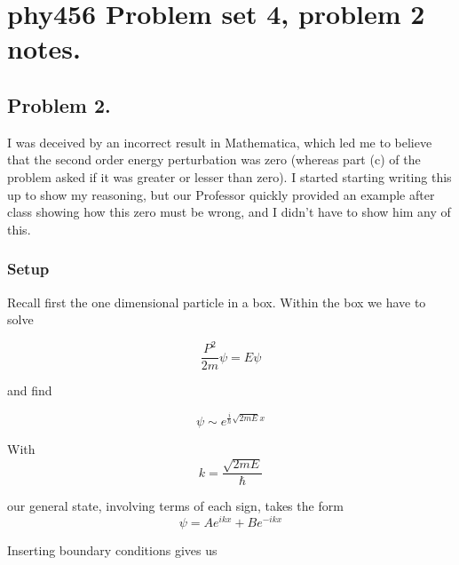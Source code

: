 
%

\chapter{phy456 Problem set 4, problem 2 notes.}
\label{chap:qmTwoPs4}
{}
\date{Oct 12, 2011}

\beginArtNoToc

\section{Problem 2.}

I was deceived by an incorrect result in Mathematica, which led me to believe that the second order energy perturbation was zero (whereas part (c) of the problem asked if it was greater or lesser than zero).  I started starting writing this up to show my reasoning, but our Professor quickly provided an example after class showing how this zero must be wrong, and I didn't have to show him any of this.

\subsection{Setup}

Recall first the one dimensional particle in a box.  Within the box we have to solve

\begin{equation}\label{eqn:qmTwoPs4:10}
\frac{P^2}{2m} \psi = E\psi
\end{equation}

and find 

\begin{equation}\label{eqn:qmTwoPs4:30}
\psi \sim
e^{\frac{i}{\hbar} \sqrt{2 m E} x} 
\end{equation}

With
\begin{equation}\label{eqn:qmTwoPs4:50}
k = \frac{\sqrt{2 m E}}{\hbar}
\end{equation}

our general state, involving terms of each sign, takes the form
\begin{equation}\label{eqn:qmTwoPs4:70}
\psi = 
A e^{ i k x } +B e^{ -i k x }
\end{equation}

Inserting boundary conditions gives us

